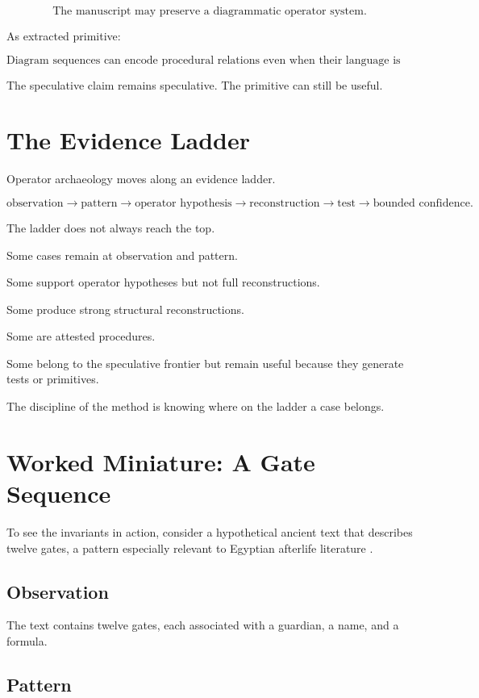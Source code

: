 \documentclass[11pt]{book}
\begin{document}
\[
\text{The manuscript may preserve a diagrammatic operator system.}
\]

As extracted primitive:

\[
\text{Diagram sequences can encode procedural relations even when their language is uncertain.}
\]

The speculative claim remains speculative. The primitive can still be useful.

\section{The Evidence Ladder}

Operator archaeology moves along an evidence ladder.

\[
\text{observation}
\rightarrow
\text{pattern}
\rightarrow
\text{operator hypothesis}
\rightarrow
\text{reconstruction}
\rightarrow
\text{test}
\rightarrow
\text{bounded confidence}.
\]

The ladder does not always reach the top.

Some cases remain at observation and pattern.

Some support operator hypotheses but not full reconstructions.

Some produce strong structural reconstructions.

Some are attested procedures.

Some belong to the speculative frontier but remain useful because they generate tests or primitives.

The discipline of the method is knowing where on the ladder a case belongs.

\section{Worked Miniature: A Gate Sequence}

To see the invariants in action, consider a hypothetical ancient text that describes twelve gates, a pattern especially relevant to Egyptian afterlife literature \cite{Allen1974BookDead,Faulkner1972BookDead,Hornung1999BooksAfterlife}.

\subsection{Observation}

The text contains twelve gates, each associated with a guardian, a name, and a formula.

\subsection{Pattern}
\end{document}
